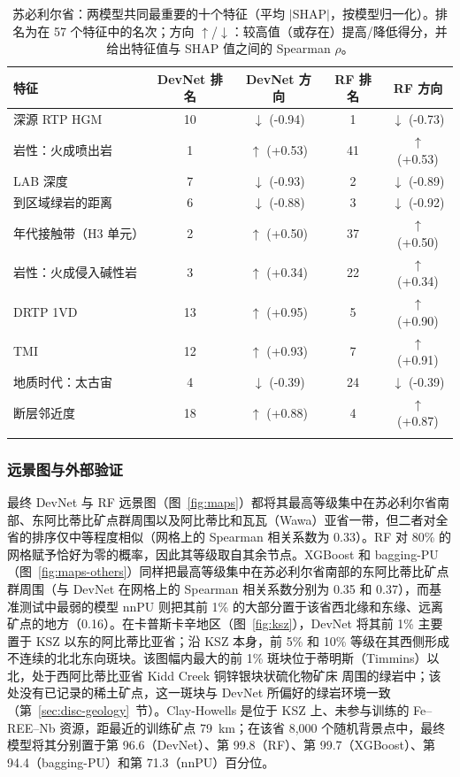\documentclass[pdflatex,sn-apa]{sn-jnl}
\begin{document}
\begin{table}[t]
\caption{苏必利尔省：两模型共同最重要的十个特征（平均 $|$SHAP$|$，按模型归一化）。排名为在 57 个特征中的名次；方向 $\uparrow$/$\downarrow$：较高值（或存在）提高/降低得分，并给出特征值与 SHAP 值之间的 Spearman $\rho$。}\label{tab:shap}
\scriptsize
\setlength{\tabcolsep}{2.5pt}
\begin{tabular*}{\textwidth}{@{\extracolsep\fill}lcccc}
\toprule
特征 & DevNet 排名 & DevNet 方向 & RF 排名 & RF 方向 \\
\midrule
深源 RTP HGM & 10 & $\downarrow$ (-0.94) & 1 & $\downarrow$ (-0.73) \\
岩性：火成喷出岩 & 1 & $\uparrow$ (+0.53) & 41 & $\uparrow$ (+0.53) \\
LAB 深度 & 7 & $\downarrow$ (-0.93) & 2 & $\downarrow$ (-0.89) \\
到区域绿岩的距离 & 6 & $\downarrow$ (-0.88) & 3 & $\downarrow$ (-0.92) \\
年代接触带（H3 单元） & 2 & $\uparrow$ (+0.50) & 37 & $\uparrow$ (+0.50) \\
岩性：火成侵入碱性岩 & 3 & $\uparrow$ (+0.34) & 22 & $\uparrow$ (+0.34) \\
DRTP 1VD & 13 & $\uparrow$ (+0.95) & 5 & $\uparrow$ (+0.90) \\
TMI & 12 & $\uparrow$ (+0.93) & 7 & $\uparrow$ (+0.91) \\
地质时代：太古宙 & 4 & $\downarrow$ (-0.39) & 24 & $\downarrow$ (-0.39) \\
断层邻近度 & 18 & $\uparrow$ (+0.88) & 4 & $\uparrow$ (+0.87) \\
\botrule
\end{tabular*}
\end{table}

\subsubsection{远景图与外部验证}\label{sec:res-maps}

最终 DevNet 与 RF 远景图（图~\ref{fig:maps}）都将其最高等级集中在苏必利尔省南部、东阿比蒂比矿点群周围以及阿比蒂比和瓦瓦（Wawa）亚省一带，但二者对全省的排序仅中等程度相似（网格上的 Spearman 相关系数为 0.33）。RF 对 80\% 的网格赋予恰好为零的概率，因此其等级取自其余节点。XGBoost 和 bagging-PU（图~\ref{fig:maps-others}）同样把最高等级集中在苏必利尔省南部的东阿比蒂比矿点群周围（与 DevNet 在网格上的 Spearman 相关系数分别为 0.35 和 0.37），而基准测试中最弱的模型 nnPU 则把其前 1\% 的大部分置于该省西北缘和东缘、远离矿点的地方（0.16）。在卡普斯卡辛地区（图~\ref{fig:ksz}），DevNet 将其前 1\% 主要置于 KSZ 以东的阿比蒂比亚省；沿 KSZ 本身，前 5\% 和 10\% 等级在其西侧形成不连续的北北东向斑块。该图幅内最大的前 1\% 斑块位于蒂明斯（Timmins）以北，处于西阿比蒂比亚省 Kidd Creek 铜锌银块状硫化物矿床 \citep{Hannington1999} 周围的绿岩中；该处没有已记录的稀土矿点，这一斑块与 DevNet 所偏好的绿岩环境一致（第~\ref{sec:disc-geology}~节）。Clay-Howells 是位于 KSZ 上、未参与训练的 Fe--REE--Nb 资源，距最近的训练矿点 79~km；在该省 8,000 个随机背景点中，最终模型将其分别置于第 96.6（DevNet）、第 99.8（RF）、第 99.7（XGBoost）、第 94.4（bagging-PU）和第 71.3（nnPU）百分位。
\end{document}
